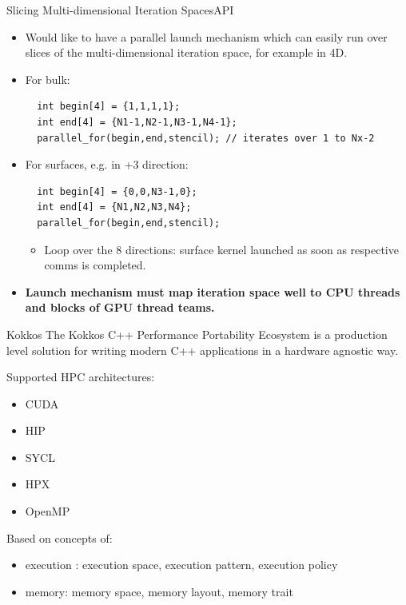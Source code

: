 \begin{frame}[fragile]{Slicing Multi-dimensional Iteration Spaces}{API}
    \begin{itemize}
      \item<1-> Would like to have a parallel launch mechanism which can easily run over slices of the multi-dimensional iteration space, for example in 4D.
      \vspace{0.6cm}
    \item<2-> For bulk:\\ 
      \begin{verbatim}
  int begin[4] = {1,1,1,1};
  int end[4] = {N1-1,N2-1,N3-1,N4-1}; 
  parallel_for(begin,end,stencil); // iterates over 1 to Nx-2
      \end{verbatim}
      \item<3-> For surfaces, e.g. in +3 direction: 
      \begin{verbatim}
  int begin[4] = {0,0,N3-1,0};
  int end[4] = {N1,N2,N3,N4};
  parallel_for(begin,end,stencil);
      \end{verbatim}
      \vspace{0.5cm}
      \begin{itemize}
        \item Loop over the 8 directions: surface kernel launched as soon as respective comms is completed.
      \end{itemize}
      \vspace{0.6cm}
      \item<4-> \textbf{Launch mechanism must map iteration space well to CPU threads and blocks of GPU thread teams.}
    \end{itemize}
\end{frame}

\begin{frame}{Kokkos}
  The Kokkos C++ Performance Portability Ecosystem is a production
  level solution for writing modern C++ applications in a hardware agnostic way.\\
  
  \begin{bkblock}{Supported HPC architectures:}
    \begin{itemize}
      \item CUDA
      \item HIP
      \item SYCL
      \item HPX
      \item OpenMP
    \end{itemize}
  \end{bkblock}

  Based on concepts of:
  \begin{itemize}
    \item execution : execution space, execution pattern, execution policy
    \item memory: memory space, memory layout, memory trait
  \end{itemize}
\end{frame}


